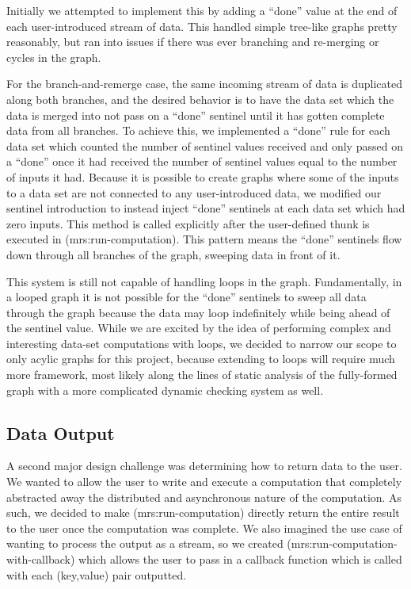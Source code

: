 \documentclass{article}
\begin{document}
Initially we attempted to implement this by adding a ``done'' value at the
end of each user-introduced stream of data. This handled simple tree-like
graphs pretty reasonably, but ran into issues if there was ever branching and
re-merging or cycles in the graph.

For the branch-and-remerge case, the same
incoming stream of data is duplicated along both branches, and the desired
behavior is to have the data set which the data is merged into not pass on
a ``done'' sentinel until it has gotten complete data from all branches.
To achieve this, we implemented a ``done'' rule for each data set which
counted the number of sentinel values received and only passed on a ``done''
once it had received the number of sentinel values equal to the number of
inputs it had. Because it is possible to create graphs where some of the
inputs to a data set are not connected to any user-introduced data, we
modified our sentinel introduction to instead inject ``done'' sentinels
at each data set which had zero inputs. This method is called explicitly
after the user-defined thunk is executed in (mrs:run-computation). This
pattern means the ``done'' sentinels flow down through all branches of
the graph, sweeping data in front of it.

This system is still not capable of handling loops in the graph. Fundamentally,
in a looped graph it is not possible for the ``done'' sentinels to sweep
all data through the graph because the data may loop indefinitely while being
ahead of the sentinel value. While we are excited by the idea of performing
complex and interesting data-set computations with loops, we decided to
narrow our scope to only acylic graphs for this project, because extending
to loops will require much more framework, most likely along the lines of
static analysis of the fully-formed graph with a more complicated dynamic
checking system as well.

\subsection{Data Output}

A second major design challenge was determining how to return data to the user.
We wanted to allow the user to write and execute a computation that completely
abstracted away the distributed and asynchronous nature of the computation. As
such, we decided to make (mrs:run-computation) directly return the entire
result to the user once the computation was complete. We also imagined the use
case of wanting to process the output as a stream, so we created (mrs:run-computation-with-callback)
which allows the user to pass in a callback function which is called with each
(key,value) pair outputted.
\end{document}
